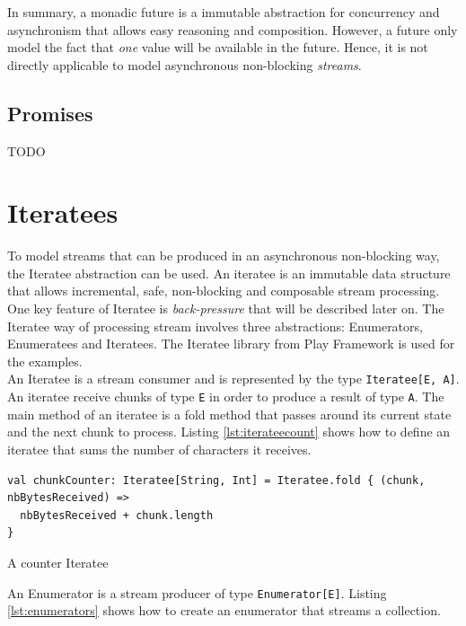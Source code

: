 In summary, a monadic future is a immutable abstraction for concurrency and asynchronism that allows easy reasoning and composition.
However, a future only model the fact that \textit{one} value will be available in the future. Hence, it is not directly applicable
to model asynchronous non-blocking \textit{streams}.

\subsection{Promises}
\label{sec:promises}

TODO

\section{Iteratees}
\label{sec:iteratees}

To model streams that can be produced in an asynchronous non-blocking way, the Iteratee abstraction can be used. An iteratee is an immutable data structure
that allows incremental, safe, non-blocking and composable stream processing. One key feature of Iteratee is \textit{back-pressure} that will be described later on.
The Iteratee way of processing stream involves three abstractions: Enumerators, Enumeratees and Iteratees. The Iteratee library from Play Framework 
 is used for the examples.
\\

An Iteratee is a stream consumer and is represented by the type \verb|Iteratee[E, A]|. An iteratee receive chunks of type \verb|E| 
in order to produce a result of type \verb|A|. The main method of an iteratee is a fold method that passes around its current state and the
next chunk to process.
Listing \ref{lst:iterateecount} shows how to define an iteratee that sums the number of characters it receives.

\begin{listing}[h]
\begin{verbatim}
val chunkCounter: Iteratee[String, Int] = Iteratee.fold { (chunk, nbBytesReceived) =>
  nbBytesReceived + chunk.length
}
\end{verbatim}
\caption{A counter Iteratee}
\label{lst:iterateecount}
\end{listing}

An Enumerator is a stream producer of type \verb|Enumerator[E]|. Listing \ref{lst:enumerators} shows how to create an enumerator that streams a collection.


